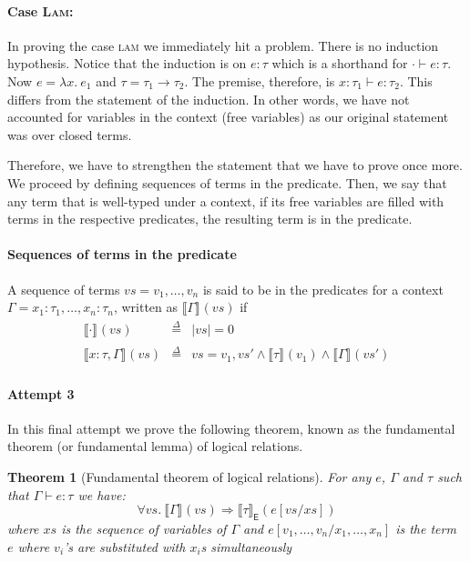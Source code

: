 \documentclass{article}
\newtheorem{theorem}{Theorem}
\newcommand{\EXP}{\mathsf{E}}
\newcommand{\defeq}{\overset{\Delta}{=}}
\newcommand{\semtyp}[2]{\llbracket #2 \rrbracket_{#1}}
\begin{document}
\paragraph{Case \textsc{Lam}:}
In proving the case \textsc{lam} we immediately hit a problem. There is no induction hypothesis.
Notice that the induction is on $e : \tau$ which is a shorthand for $\cdot \vdash e : \tau$.
Now $e = \lambda x.~e_1$ and $\tau = \tau_1 \to \tau_2$. The premise, therefore, is $x : \tau_1 \vdash e : \tau_2$. This differs from the statement of the induction.
In other words, we have not accounted for variables in the context (free variables) as our original statement was over closed terms.

Therefore, we have to strengthen the statement that we have to prove once more.
We proceed by defining sequences of terms in the predicate. Then, we say that any term that
is well-typed under a context, if its free variables are filled with terms in the respective
predicates, the resulting term is in the predicate.

\paragraph{Sequences of terms in the predicate}
A sequence of terms $\mathit{vs} = v_1, \dots,v_n$ is said to be in the predicates for a context
$\Gamma = x_1 : \tau_1,\dots, x_n : \tau_n$, written as $\semtyp{}{\Gamma}(vs)$ if
\[
\begin{array}{lll}
\semtyp{}{\cdot}(\mathit{vs}) &\defeq& |\mathit{vs}| = 0\\
\semtyp{}{x : \tau, \Gamma}(\mathit{vs}) &\defeq& vs = v_1, \mathit{vs'} \land \semtyp{}{\tau}(v_1) \land
\semtyp{}{\Gamma}(\mathit{vs'})
\end{array}
\]

\paragraph{Attempt 3}
In this final attempt we prove the following theorem, known as the fundamental theorem (or fundamental lemma) of logical relations.

\begin{theorem}[Fundamental theorem of logical relations]
For any $e$, $\Gamma$ and $\tau$ such that $\Gamma \vdash e : \tau$ we have:
\[
\forall \mathit{vs}. ~\semtyp{}{\Gamma}(\mathit{vs}) \Rightarrow
\semtyp{\EXP}{\tau}(e[\mathit{vs}/\mathit{xs}])
\]
where $\mathit{xs}$ is the sequence of variables of $\Gamma$ and
$e[v_1, \dots, v_n/x_1, \dots, x_n]$ is the term $e$ where $v_i$'s are substituted with $x_i$s simultaneously
\end{theorem}
\end{document}
